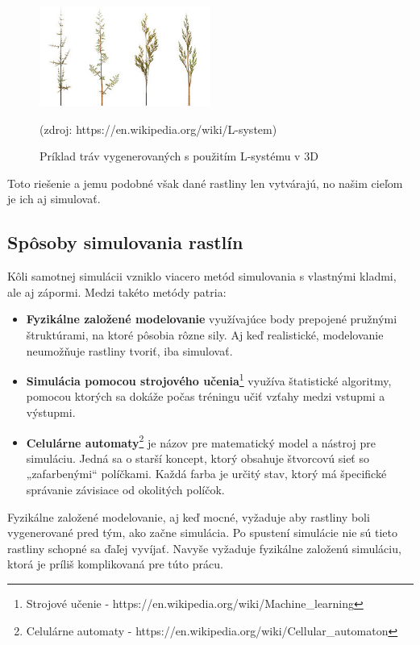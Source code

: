 \documentclass[12pt]{article}
\begin{document}
\begin{figure}[ht]
	\centering
	\includegraphics[width=0.5\textwidth]{res/Fractal_weeds.png}
	\caption{Príklad tráv vygenerovaných s použitím L-systému v 3D}

	\footnotesize (zdroj: https://en.wikipedia.org/wiki/L-system)

	\label{obr:priklad l-systemu}
\end{figure}

Toto riešenie a jemu podobné však dané rastliny len vytvárajú, no našim cieľom
je ich aj simulovať.


\subsection{Spôsoby simulovania rastlín}

Kôli samotnej simulácii vzniklo viacero metód simulovania s vlastnými kladmi,
ale aj zápormi. Medzi takéto metódy patria:

\begin{itemize}
	\item \textbf{Fyzikálne založené modelovanie} využívajúce body prepojené
		pružnými štruktúrami, na ktoré pôsobia rôzne sily. Aj keď realistické,
		modelovanie neumožňuje rastliny tvoriť, iba simulovať.
	\item \textbf{Simulácia pomocou strojového učenia}\footnote
			{Strojové učenie - https://en.wikipedia.org/wiki/Machine\_learning}
		využíva štatistické
		algoritmy, pomocou ktorých sa dokáže počas tréningu učiť vzťahy medzi
		vstupmi a výstupmi.
	\item \textbf{Celulárne automaty}\footnote
			{Celulárne automaty - https://en.wikipedia.org/wiki/Cellular\_automaton}
		je názov pre matematický model a nástroj pre simuláciu. Jedná sa
		o starší koncept, ktorý obsahuje štvorcovú sieť so „zafarbenými“
		políčkami. Každá farba je určitý stav, ktorý má špecifické správanie
		závisiace od okolitých políčok.
\end{itemize}

Fyzikálne založené modelovanie, aj keď mocné, vyžaduje aby rastliny boli
vygenerované pred tým, ako začne simulácia. Po spustení simulácie nie sú tieto
rastliny schopné sa ďaľej vyvíjať. Navyše vyžaduje fyzikálne založenú
simuláciu, ktorá je príliš komplikovaná pre túto prácu.
\end{document}
